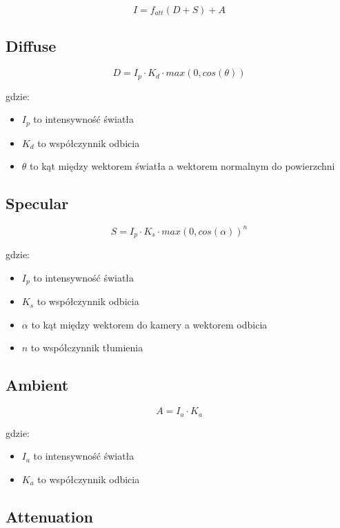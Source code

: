 \documentclass{../notatki}
\begin{document}
$$
I = f_{att}(D + S) + A
$$

\subsection{Diffuse}

$$
D = I_p \cdot K_d \cdot max(0, cos(\theta))
$$

gdzie:

\begin{itemize}
    \item $I_p$ to intensywność światła
    \item $K_d$ to współczynnik odbicia
    \item $\theta$ to kąt między wektorem światła a wektorem normalnym do powierzchni
\end{itemize}

\subsection{Specular}

$$
S = I_p \cdot K_s \cdot max(0, cos(\alpha))^n
$$

gdzie:

\begin{itemize}
    \item $I_p$ to intensywność światła
    \item $K_s$ to współczynnik odbicia
    \item $\alpha$ to kąt między wektorem do kamery a wektorem odbicia
    \item $n$ to współczynnik tłumienia
\end{itemize}

\subsection{Ambient}

$$
A = I_a \cdot K_a
$$

gdzie:

\begin{itemize}
    \item $I_a$ to intensywność światła
    \item $K_a$ to współczynnik odbicia
\end{itemize}

\subsection{Attenuation}
\end{document}
